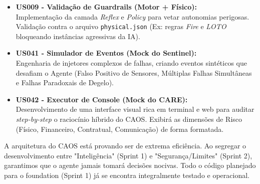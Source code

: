 \documentclass[11pt,a4paper]{article}
\begin{document}
\begin{itemize}[label={\color{vivaBlue}\textbf{$\rightarrow$}}, leftmargin=*]
    \setlength\itemsep{0.5em}

    \item \textbf{US009 - Validação de Guardrails (Motor + Físico):}\\
    Implementação da camada \textit{Reflex} e \textit{Policy} para vetar autonomias perigosas. Validação contra o arquivo \texttt{physical.json} (Ex: regras \textit{Fire} e \textit{LOTO} bloqueando instâncias agressivas da IA).
    
    \item \textbf{US041 - Simulador de Eventos (Mock do Sentinel):}\\
    Engenharia de injetores complexos de falhas, criando eventos sintéticos que desafiam o Agente (Falso Positivo de Sensores, Múltiplas Falhas Simultâneas e Falhas Paradoxais de Degelo).
    
    \item \textbf{US042 - Executor de Console (Mock do CARE):}\\
    Desenvolvimento de uma interface visual rica em terminal e web para auditar \textit{step-by-step} o raciocínio híbrido do CAOS. Exibirá as dimensões de Risco (Físico, Financeiro, Contratual, Comunicação) de forma formatada.
\end{itemize}

\vspace{1cm}

\begin{statusbox}
A arquitetura do CAOS está provando ser de extrema eficiência. Ao segregar o desenvolvimento entre "Inteligência" (Sprint 1) e "Segurança/Limites" (Sprint 2), garantimos que o agente jamais tomará decisões nocivas. Todo o código planejado para o foundation (Sprint 1) já se encontra integralmente testado e operacional.
\end{statusbox}
\end{document}
